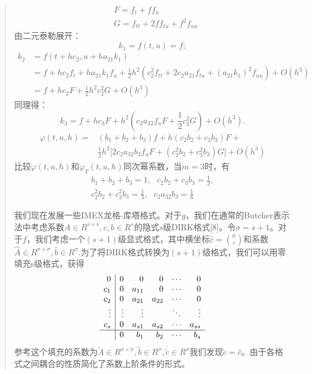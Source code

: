 \documentclass{article}
\begin{document}
\begin{CJK}{UTF8}{gkai}
\begin{quotation}
\begin{align*}
&F=f_{t}+ff_{u}\\
&G=f_{tt}+2ff_{tu}+f^2f_{uu}
\end{align*}
由二元泰勒展开：
\begin{equation*}
k_{1}=f(t,u)=f;
\end{equation*}
\begin{align*}
k_{2}&=f(t+hc_{2},u+ha_{21}k_{1})\\
&=f+hc_{2}f_{t}+ha_{21}k_{1}f_{u}+\frac{1}{2}h^2(c_{2}^2f_{tt}+2c_{2}a_{21}f_{tu}+(a_{21}k_{1})^2f_{uu})+O(h^3)\\
&=f+hc_{2}F+\frac{1}{2}h^2c_{2}^2G+O(h^3)
\end{align*}
同理得：
\begin{equation*}
k_{3}=f+hc_{3}F+h^2(c_{2}a_{32}f_{u}F+\frac{1}{2}c_{3}^2G)+O(h^3).
\end{equation*}
\begin{align*}
\varphi(t,u,h)=&(b_{1}+b_{2}+b_{3})f+h(c_{2}b_{2}+c_{3}b_{3})F+\\
&\frac{1}{2}h^2\biggl[2c_{2}a_{32}b_{3}f_{u}F+(c_{2}^2b_{2}+c_{3}^2b_{3})G\biggr]+O(h^3)
\end{align*}
比较$\varphi(t,u,h)$和$\varphi_{T}(t,u,h)$同次幂系数，当$m=3$时，有
\begin{gather*}
b_{1}+b_{2}+b_{3}=1,~~~c_{2}b_{2}+c_{3}b_{3}=\frac{1}{2},\\
c_{2}^2b_{2}+c_{3}^2b_{3}=\frac{1}{3},~~~c_{2}a_{32}b_{3}=\frac{1}{6}
\end{gather*}



我们现在发展一些IMEX龙格-库塔格式。对于$g$，我们在通常的Butcher表示法中考虑系数$A\in R^{s\times s} ,c,b\in R^s$的隐式$s$级DIRK格式[8]。令$\sigma=s+1$。对于$f$，我们考虑一个$(s+1)$级显式格式，其中横坐标$\widehat{c}=\binom{0}{c}$和系数$\widehat{A}\in R^{\sigma\times \sigma},\widehat{b}\in
R^{\sigma}.$为了将DIRK格式转换为$(s+1)$级格式，我们可以用零填充s级格式，获得
\[
\begin{array}{r|r r r r  r}
0 &  0 & 0 & 0  & \cdots & 0 \\
c_{1} & 0 & a_{11} & 0 & \cdots & 0 \\
c_{2} & 0 & a_{21} & a_{22} & \cdots & 0 \\
\vdots & \vdots &  \vdots &  &  \ddots &  \vdots \\
c_{s} & 0 & a_{s1} & a_{s2} & \cdots & a_{ss} \\
\hline
 & 0 & b_{1} & b_{2} & \cdots & b_{s} 
\end{array}
\]
参考这个填充的系数为$\tilde{A}\in R^{\sigma\times\sigma},\tilde{b}\in R^{\sigma},\tilde{c}\in R^{\sigma}$我们发现$\tilde{c}=\widehat{c}$。由于各格式之间耦合的性质简化了系数上阶条件的形式。


\end{quotation}
\end{CJK}
\end{document}
